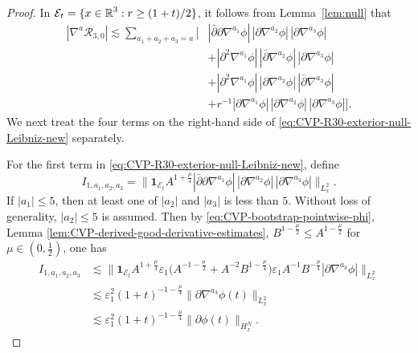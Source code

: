 \documentclass[11pt,twoside]{article}
\def\R{\mathop{\mathbb R\kern 0pt}\nolimits}
\def\f{\frac}
\def\p{\partial}
\def\ve{\varepsilon}
\def\ls{\lesssim}
\theoremstyle{plain}
\theoremstyle{definition}
\theoremstyle{assumption}
\numberwithin{equation}{section}
\begin{document}
\begin{proof}
		In $\mathcal E_t=\{x\in\R^3:r\ge (1+t)/2\}$,
		it follows from Lemma~\ref{lem:null} that
		\begin{equation}
			\label{eq:CVP-R30-exterior-null-Leibniz-new}
			\begin{aligned}
				|\nabla^a\mathcal R_{3,0}|
				\ls
				\sum_{a_1+a_2+a_3=a}
				\big[
				&
				|\bar\p\p\nabla^{a_1}\phi|\,
				|\p\nabla^{a_2}\phi|\,
				|\p\nabla^{a_3}\phi|
				\\
				&+
				|\p^2\nabla^{a_1}\phi|\,
				|\bar\p\nabla^{a_2}\phi|\,
				|\p\nabla^{a_3}\phi|
				\\
				&+
				|\p^2\nabla^{a_1}\phi|\,
				|\p\nabla^{a_2}\phi|\,
				|\bar\p\nabla^{a_3}\phi|
				\\
				&+
				r^{-1}
				|\p\nabla^{a_1}\phi|\,
				|\p\nabla^{a_2}\phi|\,
				|\p\nabla^{a_3}\phi|
				\big].
			\end{aligned}
		\end{equation}
		We next treat  the four terms on the right-hand side of \eqref{eq:CVP-R30-exterior-null-Leibniz-new}  separately.
		
		For the first term in \eqref{eq:CVP-R30-exterior-null-Leibniz-new}, define
		\[
		I_{1,a_1,a_2,a_3}
		=
		\big\|
		\mathbf 1_{\mathcal E_t}
		A^{1+\frac{\mu}{4}}
		|\bar\p\p\nabla^{a_1}\phi|\,
		|\p\nabla^{a_2}\phi|\,
		|\p\nabla^{a_3}\phi|
		\big\|_{L^2_x}.
		\]
		If \(|a_1|\le 5\), then at least one of \(|a_2|\) and \(|a_3|\) is less than
		\(5\). Without loss of generality, \(|a_2|\le 5\)
is assumed. Then by \eqref{eq:CVP-bootstrap-pointwise-phi}, Lemma \ref{lem:CVP-derived-good-derivative-estimates}, $B^{1-\f\mu2}\le A^{1-\f\mu2}$ for $\mu\in(0,\f12)$, one has
		\begin{equation}
			\label{eq:CVP-R30-I1-low-good-new}
			\begin{aligned}
				I_{1,a_1,a_2,a_3}
				&\ls
				\big\|
				\mathbf 1_{\mathcal E_t}
				A^{1+\frac{\mu}{4}}
				\ve_1
				\big(
				A^{-1-\frac{\mu}{2}}
				+
				A^{-2}B^{1-\frac{\mu}{4}}
				\big)
				\ve_1A^{-1}B^{-\frac{\mu}{4}}
				|\p\nabla^{a_3}\phi|
				\big\|_{L^2_x}
				\\
				&\ls
				\ve_1^2
				(1+t)^{-1-\frac{\mu}{4}}
				\|\p\nabla^{a_3}\phi(t)\|_{L^2_x}
				\\
				&\ls
				\ve_1^2
				(1+t)^{-1-\frac{\mu}{4}}
				\|\p\phi(t)\|_{H^N_x}.
			\end{aligned}
		\end{equation}


\end{proof}
\end{document}
